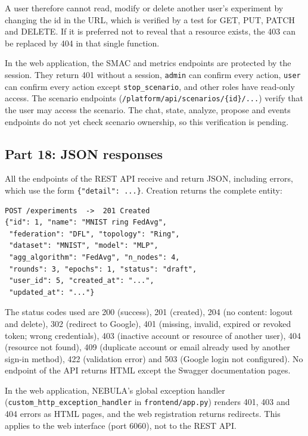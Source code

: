 \documentclass[9pt,a4paper,twocolumn]{article}
\begin{document}
A user therefore cannot read, modify or delete another user's experiment by changing the id in the URL, which is verified by a test for GET, PUT, PATCH and DELETE. If it is preferred not to reveal that a resource exists, the 403 can be replaced by 404 in that single function.

In the web application, the SMAC and metrics endpoints are protected by the session. They return 401 without a session, \texttt{admin} can confirm every action, \texttt{user} can confirm every action except \texttt{stop\_scenario}, and other roles have read-only access. The scenario endpoints (\texttt{/platform/api/scenarios/\{id\}/...}) verify that the user may access the scenario. The chat, state, analyze, propose and events endpoints do not yet check scenario ownership, so this verification is pending.

\subsection{Part 18: JSON responses}

All the endpoints of the REST API receive and return JSON, including errors, which use the form \texttt{\{"detail": ...\}}. Creation returns the complete entity:

\begin{lstlisting}[basicstyle=\ttfamily\footnotesize]
POST /experiments  ->  201 Created
{"id": 1, "name": "MNIST ring FedAvg",
 "federation": "DFL", "topology": "Ring",
 "dataset": "MNIST", "model": "MLP",
 "agg_algorithm": "FedAvg", "n_nodes": 4,
 "rounds": 3, "epochs": 1, "status": "draft",
 "user_id": 5, "created_at": "...",
 "updated_at": "..."}
\end{lstlisting}

The status codes used are 200 (success), 201 (created), 204 (no content: logout and delete), 302 (redirect to Google), 401 (missing, invalid, expired or revoked token; wrong credentials), 403 (inactive account or resource of another user), 404 (resource not found), 409 (duplicate account or email already used by another sign-in method), 422 (validation error) and 503 (Google login not configured). No endpoint of the API returns HTML except the Swagger documentation pages.

In the web application, NEBULA's global exception handler (\texttt{custom\_http\_exception\_handler} in \texttt{frontend/app.py}) renders 401, 403 and 404 errors as HTML pages, and the web registration returns redirects. This applies to the web interface (port 6060), not to the REST API.
\end{document}
